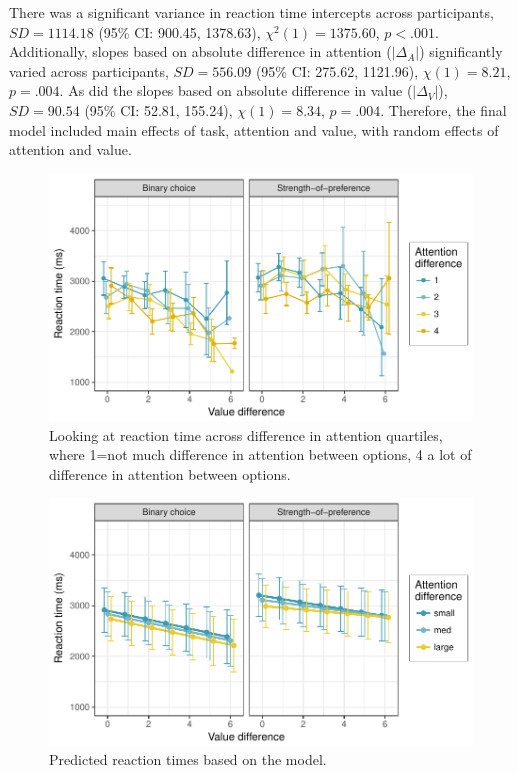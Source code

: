 \documentclass[12pt]{article}
\begin{document}


There was a significant variance in reaction time intercepts across participants, $SD=1114.18$ (95\% CI: 900.45, 1378.63), $\chi^2(1)=1375.60$, $p<.001$. Additionally, slopes based on absolute difference in attention ($|\Delta_A|$) significantly varied across participants, $SD=556.09$ (95\% CI: 275.62, 1121.96), $\chi(1)=8.21$, $p=.004$. As did the slopes based on absolute difference in value ($|\Delta_V|$), $SD=90.54$ (95\% CI: 52.81, 155.24), $\chi(1)=8.34$, $p=.004$. Therefore, the final model included main effects of task, attention and value, with random effects of attention and value. 

\begin{figure}[b!]
	\centering
	\includegraphics{images/RTattentionValueGraph}
	\caption{Looking at reaction time across difference in attention quartiles, where 1=not much difference in attention between options, 4 a lot of difference in attention between options.}
	\label{figure:RTattentionValueGraph}
\end{figure}

\begin{figure}[b!]
	\centering
	\includegraphics{images/predictedRTattentionValueGraph.pdf}
	\caption{Predicted reaction times based on the model.}
	\label{figure:predictedRTattentionValueGraph}
\end{figure}
\end{document}

